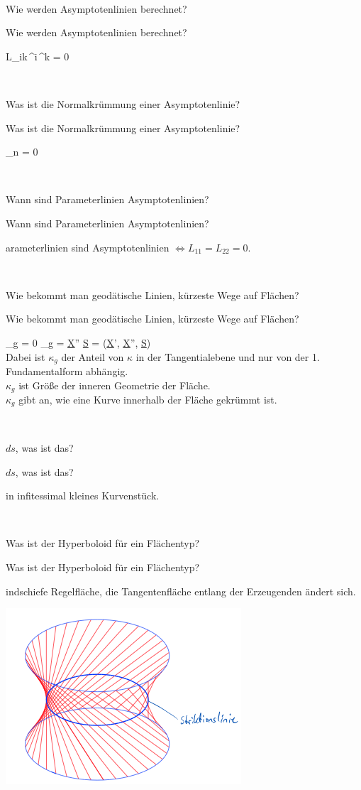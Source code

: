 \documentclass[DIV=1]{scrartcl}
\newcommand{\frage}[3][10]{
    \newpage
    \ 
    \vspace{#1 em}
    \begin{framed}
        #2
    \end{framed}
    \newpage
    \begin{framed}
        #2
    \end{framed}
    \vspace{2 em}
}
\begin{document}
\frage{Wie werden Asymptotenlinien berechnet?}

\[
    L_{ik}\,^i\,^k = 0 \qquad {}
\]



\frage{Was ist die Normalkrümmung einer Asymptotenlinie?}

\[
    \kappa_n = 0
\]



\frage{Wann sind Parameterlinien Asymptotenlinien?}

Parameterlinien sind Asymptotenlinien $\Leftrightarrow L_{11} = L_{22} = 0$.



\frage{Wie bekommt man geodätische Linien, kürzeste Wege auf Flächen?}

\[
    \kappa_g = 0 
    \qquad\qquad\qquad\qquad
    \kappa_g  = \underline{X}'' \cdot \underline{S} = \det(\underline{X}', \underline{X}'', \underline{S})
\]
\\
Dabei ist $\kappa_g$ der Anteil von $\kappa$ in der Tangentialebene und nur von der 1. Fundamentalform abhängig.\\
$\kappa_g$ ist Größe der inneren Geometrie der Fläche.\\
$\kappa_g$ gibt an, wie eine Kurve innerhalb der Fläche gekrümmt ist.



\frage{$ds$, was ist das?}

Ein infitessimal kleines Kurvenstück.



\frage{Was ist der Hyperboloid für ein Flächentyp?}

Windschiefe Regelfläche, die Tangentenfläche entlang der Erzeugenden ändert sich.
\\
\begin{center}
    \includegraphics[scale=1]{hyperboloid.png}
\end{center}
\end{document}
